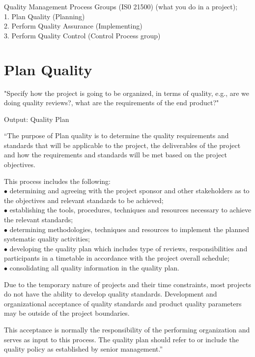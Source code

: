 \documentclass[]{project_plan}
\newcommand{\bulletPoint}{\hspace{-3.1pt}$\bullet$ \hspace{5pt}}
\begin{document}
Quality Management Process Groups (IS0 21500) (what you do in a project);\\
1. Plan Quality (Planning)\\
2. Perform Quality Assurance (Implementing)\\
3. Perform Quality Control (Control Process group)

\section{Plan Quality}

"Specify how the project is going to be organized, in terms of quality, e.g.,
are we doing quality reviews?, what are the requirements of the end product?"

Output: Quality Plan

“The purpose of Plan quality is to determine the quality requirements and standards that will be applicable to
the project, the deliverables of the project and how the requirements and standards will be met based on the
project objectives.

This process includes the following:\\
\bulletPoint determining and agreeing with the project sponsor and other stakeholders as to the objectives and
relevant standards to be achieved;\\
\bulletPoint establishing the tools, procedures, techniques and resources necessary to achieve the relevant standards;\\
\bulletPoint determining methodologies, techniques and resources to implement the planned systematic quality
activities;\\
\bulletPoint developing the quality plan which includes type of reviews, responsibilities and participants in a timetable
in accordance with the project overall schedule;\\
\bulletPoint consolidating all quality information in the quality plan.

Due to the temporary nature of projects and their time constraints, most projects do not have the ability to
develop quality standards. Development and organizational acceptance of quality standards and product
quality parameters may be outside of the project boundaries.

This acceptance is normally the responsibility of
the performing organization and serves as input to this process. The quality plan should refer to or include the
quality policy as established by senior management.”
\end{document}

